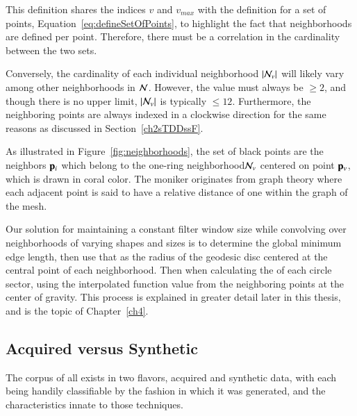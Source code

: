 This definition shares the indices $v$ and $v_{max}$ with the definition for a set of points, Equation~\ref{eq:defineSetOfPoints}, to highlight the fact that neighborhoods are defined per point. Therefore, there must be a correlation in the cardinality between the two sets.

Conversely, the cardinality of each individual neighborhood $|\mathcal{N}_v|$ will likely vary among other neighborhoods in $\mathcal{N}$. However, the value must always be $\geq 2$, and though there is no upper limit, $|\mathcal{N}_v|$ is typically $\leq 12$. Furthermore, the neighboring points are always indexed in a clockwise direction for the same reasons as discussed in Section~\ref{ch2sTDDssF}.

As illustrated in Figure~\ref{fig:neighborhoods}, the set of black points are the neighbors $\mathbf{p}_i$ which belong to the one-ring neighborhood\footnotemark $\mathcal{N}_v$ centered on point $\mathbf{p}_v$, which is drawn in coral color. The moniker originates from graph theory where each adjacent point is said to have a relative distance of one within the graph of the mesh. 

Our solution for maintaining a constant filter window size while convolving  over neighborhoods of varying shapes and sizes is to determine the global minimum edge length, then use that as the radius of the geodesic disc centered at the central point of each neighborhood. Then when calculating the  of each circle sector, using the interpolated function value from the neighboring points at the center of gravity. This process is explained in greater detail later in this thesis, and is the topic of Chapter~\ref{ch4}.

%
%
%
%
\subsection{Acquired versus Synthetic \tdd{}}
\label{ch2sTDDssAVS3}
The corpus of all \tdd{} exists in two flavors, acquired and synthetic data, with each being handily classifiable by the fashion in which it was generated, and the characteristics innate to those techniques.

